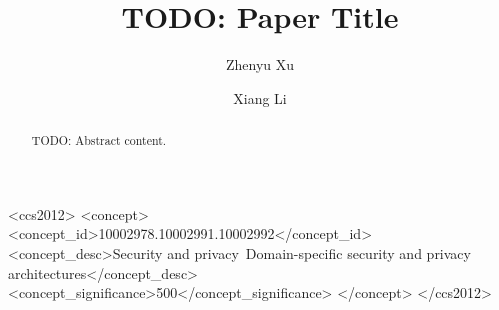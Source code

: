 \documentclass[sigconf]{acmart}
\begin{document}
\title{TODO: Paper Title}

\author{Zhenyu Xu}

\author{Xiang Li}

\renewcommand{\shortauthors}{Zhenyu Xu et al.}

\begin{abstract}
TODO: Abstract content.
\end{abstract}

\begin{CCSXML}
<ccs2012>
   <concept>
       <concept_id>10002978.10002991.10002992</concept_id>
       <concept_desc>Security and privacy~Domain-specific security and privacy architectures</concept_desc>
       <concept_significance>500</concept_significance>
   </concept>
</ccs2012>
\end{CCSXML}



\maketitle

% 





% 
% 



\end{document}
